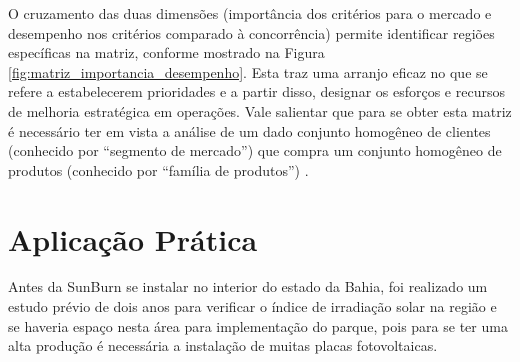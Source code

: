 O cruzamento das duas dimensões (importância dos critérios para o mercado e desempenho nos critérios comparado à concorrência) permite identificar regiões específicas na matriz, conforme mostrado na Figura \ref{fig:matriz_importancia_desempenho}. Esta traz uma arranjo eficaz no que se refere a estabelecerem prioridades e a partir disso, designar os esforços e recursos de melhoria estratégica em operações. Vale salientar que para se obter esta matriz é necessário ter em vista a análise de um dado conjunto homogêneo de clientes (conhecido por ``segmento de mercado'') que compra um conjunto homogêneo de produtos (conhecido por ``família de produtos'') \cite{correa2000administracao}.



\section{Aplicação Prática}
\label{sec:estrategia_da_producao_aplicacao}
Antes da SunBurn se instalar no interior do estado da Bahia, foi realizado um estudo prévio de dois anos para verificar o índice de irradiação solar na região e se haveria espaço nesta área para implementação do parque, pois para se ter uma alta produção é necessária a instalação de muitas placas fotovoltaicas.